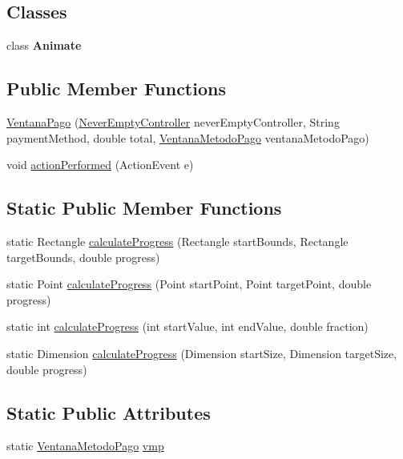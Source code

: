 \subsection*{Classes}
\begin{DoxyCompactItemize}
\item 
class {\bfseries Animate}
\end{DoxyCompactItemize}
\subsection*{Public Member Functions}
\begin{DoxyCompactItemize}
\item 
\mbox{\hyperlink{class_s_p_q_1_1gui_1_1_ventana_pago_ac192c8e330c672202608380ffaabd275}{Ventana\+Pago}} (\mbox{\hyperlink{class_s_p_q_1_1controller_1_1_never_empty_controller}{Never\+Empty\+Controller}} never\+Empty\+Controller, String payment\+Method, double total, \mbox{\hyperlink{class_s_p_q_1_1gui_1_1_ventana_metodo_pago}{Ventana\+Metodo\+Pago}} ventana\+Metodo\+Pago)
\item 
void \mbox{\hyperlink{class_s_p_q_1_1gui_1_1_ventana_pago_a64947ae1b81ff8e561792d9db382b1f9}{action\+Performed}} (Action\+Event e)
\end{DoxyCompactItemize}
\subsection*{Static Public Member Functions}
\begin{DoxyCompactItemize}
\item 
static Rectangle \mbox{\hyperlink{class_s_p_q_1_1gui_1_1_ventana_pago_ab3583b9bfd461ce0bede2df8ea8c7bd1}{calculate\+Progress}} (Rectangle start\+Bounds, Rectangle target\+Bounds, double progress)
\item 
static Point \mbox{\hyperlink{class_s_p_q_1_1gui_1_1_ventana_pago_aebf84331e3789dfd9444704d43ee3104}{calculate\+Progress}} (Point start\+Point, Point target\+Point, double progress)
\item 
static int \mbox{\hyperlink{class_s_p_q_1_1gui_1_1_ventana_pago_aa815284e8b31df848f8801518cf95c95}{calculate\+Progress}} (int start\+Value, int end\+Value, double fraction)
\item 
static Dimension \mbox{\hyperlink{class_s_p_q_1_1gui_1_1_ventana_pago_a40ab2ece25e6d7c17d9704d5172be76c}{calculate\+Progress}} (Dimension start\+Size, Dimension target\+Size, double progress)
\end{DoxyCompactItemize}
\subsection*{Static Public Attributes}
\begin{DoxyCompactItemize}
\item 
static \mbox{\hyperlink{class_s_p_q_1_1gui_1_1_ventana_metodo_pago}{Ventana\+Metodo\+Pago}} \mbox{\hyperlink{class_s_p_q_1_1gui_1_1_ventana_pago_a892d5d5fa9310e73e222681af8d5a53f}{vmp}}
\end{DoxyCompactItemize}


